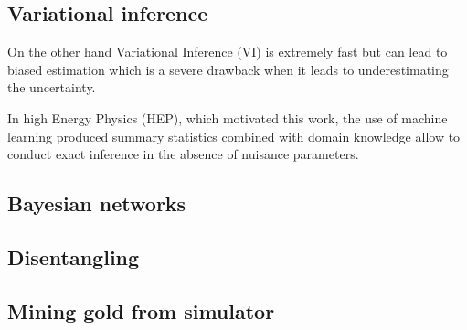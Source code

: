 \subsection{Variational inference} %
\label{sub:variational_inference}


On the other hand Variational Inference (VI) is extremely fast but can lead to biased estimation which is a severe drawback when it leads to underestimating the uncertainty.

In high Energy Physics (HEP), which motivated this work, the use of machine learning produced summary statistics combined with domain knowledge allow to conduct exact inference in the absence of nuisance parameters.







\subsection{Bayesian networks} %
\label{sub:bayesian_networks}







\subsection{Disentangling} %
\label{sub:disentangling}







\subsection{Mining gold from simulator} %
\label{sub:mining_gold_from_simulator}



